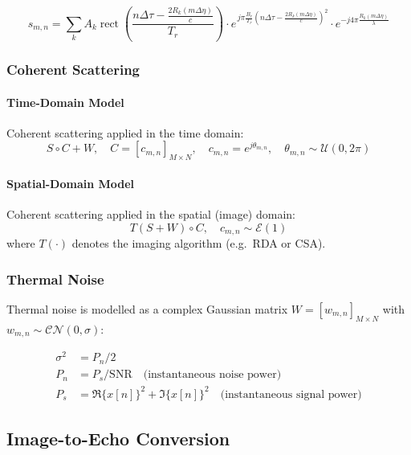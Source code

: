 \documentclass[12pt]{article}
\newcommand{\rect}{\operatorname{rect}}
\begin{document}
\begin{equation}
    s_{m,n} = \sum_k A_k
    \rect\!\left(\frac{n\Delta\tau - \frac{2R_k(m\Delta\eta)}{c}}{T_r}\right)
    \cdot e^{\,j\pi\frac{B_r}{T_r}\left(n\Delta\tau - \frac{2R_k(m\Delta\eta)}{c}\right)^2}
    \cdot e^{-j4\pi\frac{R_k(m\Delta\eta)}{\lambda}}
\end{equation}

\subsubsection{Coherent Scattering}

\paragraph{Time-Domain Model}

Coherent scattering applied in the time domain:
\begin{equation}
    S \circ C + W, \quad C = [c_{m,n}]_{M\times N},\quad c_{m,n} = e^{j\theta_{m,n}},
    \quad \theta_{m,n} \sim \mathcal{U}(0, 2\pi)
\end{equation}

\paragraph{Spatial-Domain Model}

Coherent scattering applied in the spatial (image) domain:
\begin{equation}
    T(S + W) \circ C, \quad c_{m,n} \sim \mathcal{E}(1)
\end{equation}
where $T(\cdot)$ denotes the imaging algorithm (e.g.\ RDA or CSA).

\subsubsection{Thermal Noise}

Thermal noise is modelled as a complex Gaussian matrix
$W = [w_{m,n}]_{M\times N}$ with $w_{m,n} \sim \mathcal{CN}(0,\sigma)$:

\begin{align}
    \sigma^2 &= P_n / 2 \\
    P_n &= P_s / \mathrm{SNR} \quad \text{(instantaneous noise power)} \\
    P_s &= \Re\{x[n]\}^2 + \Im\{x[n]\}^2 \quad \text{(instantaneous signal power)}
\end{align}

\subsection{Image-to-Echo Conversion}
\end{document}
